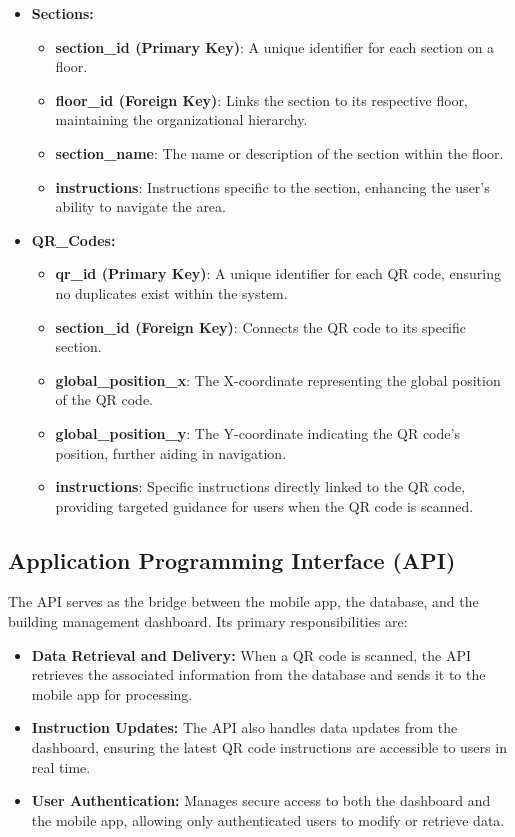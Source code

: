 \begin{itemize}
	\item \textbf{Sections:}  
	\begin{itemize}
		\item \textbf{section\_id (Primary Key)}: A unique identifier for each section on a floor.
		\item \textbf{floor\_id (Foreign Key)}: Links the section to its respective floor, maintaining the organizational hierarchy.
		\item \textbf{section\_name}: The name or description of the section within the floor.
		\item \textbf{instructions}: Instructions specific to the section, enhancing the user’s ability to navigate the area.
	\end{itemize}
	
	\item \textbf{QR\_Codes:}  
	\begin{itemize}
		\item \textbf{qr\_id (Primary Key)}: A unique identifier for each QR code, ensuring no duplicates exist within the system.
		\item \textbf{section\_id (Foreign Key)}: Connects the QR code to its specific section.
		\item \textbf{global\_position\_x}: The X-coordinate representing the global position of the QR code.
		\item \textbf{global\_position\_y}: The Y-coordinate indicating the QR code's position, further aiding in navigation.
		\item \textbf{instructions}: Specific instructions directly linked to the QR code, providing targeted guidance for users when the QR code is scanned.
	\end{itemize}
\end{itemize}

\subsection{Application Programming Interface (API)}

The API serves as the bridge between the mobile app, the database, and the building management dashboard. Its primary responsibilities are:
\begin{itemize}
	\item \textbf{Data Retrieval and Delivery:} When a QR code is scanned, the API retrieves the associated information from the database and sends it to the mobile app for processing.
	\item \textbf{Instruction Updates:} The API also handles data updates from the dashboard, ensuring the latest QR code instructions are accessible to users in real time.
	\item \textbf{User Authentication:} Manages secure access to both the dashboard and the mobile app, allowing only authenticated users to modify or retrieve data.
\end{itemize}

